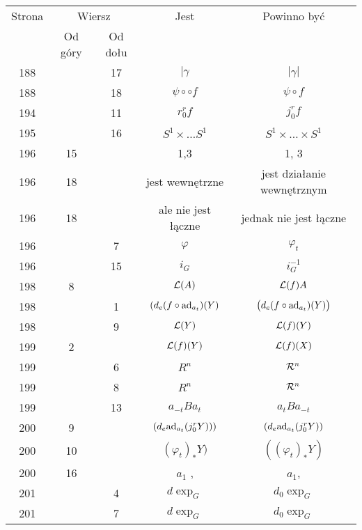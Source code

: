 \documentclass[a4paper,11pt]{article}
\begin{document}
\begin{center}
  \begin{tabular}{|c|c|c|c|c|}
    \hline
    Strona & \multicolumn{2}{c|}{Wiersz} & Jest
                              & Powinno być \\ \cline{2-3}
    & Od góry & Od dołu & & \\
    \hline
    188 & & 17 & $| \gamma$ & $| \gamma |$ \\
    188 & & 18 & $\psi \circ \circ f$ & $\psi \circ f$ \\
    194 & & 11 & $r^{ r }_{ 0 } f$ & $j^{ r }_{ 0 } f$ \\
    195 & & 16 & $S^{ 1 } \times \ldots S^{ 1 }$ & $S^{ 1 } \times \ldots \times S^{ 1 }$ \\
    196 & 15 & & 1,3 & 1, 3 \\
    196 & 18 & & jest wewnętrzne & jest działanie wewnętrznym \\
    196 & 18 & & ale nie jest łączne & jednak nie jest łączne \\
    196 & & \hphantom{0}7 & $\varphi$ & $\varphi_{ t }$ \\
    196 & & 15 & $i_{ G }$ & $i_{ G }^{ -1 }$ \\
    198 & \hphantom{0}8 & & $\mathcal{L}( A )$ & $\mathcal{L}( f )A$ \\
    198 & & \hphantom{0}1 & $( d_{ e }( f \circ \mathrm{ad}_{ a_{ t } } )( Y )$
           & $\big( d_{ e }( f \circ \mathrm{ad}_{ a_{ t } } )( Y ) \big)$ \\
    198 & & \hphantom{0}9 & $\mathcal{L}( Y )$ & $\mathcal{L}( f )( Y )$ \\
    199 & \hphantom{0}2 & & $\mathcal{L}( f )( Y )$ & $\mathcal{L}( f )( X )$ \\
    199 & & \hphantom{0}6 & $R^{ n }$ & $\mathcal{R}^{ n }$ \\
    199 & & \hphantom{0}8 & $R^{ n }$ & $\mathcal{R}^{ n }$ \\
    199 & & 13 & $a_{ -t } B a_{ t }$ & $a_{ t } B a_{ -t }$ \\
    200 & \hphantom{0}9 & & $( d_{ e }\mathrm{ad}_{ a_{ t } }( j^{ r }_{ 0 } Y ) ) )$
           & $( d_{ e }\mathrm{ad}_{ a_{ t } }( j^{ r }_{ 0 } Y ) )$ \\
    200 & 10 & & $( \varphi_{ t } )_{ * } Y )$
           & $( ( \varphi_{ t } )_{ * } Y )$ \\
    200 & 16 & & $a_{ 1 }$ , & $a_{ 1 }$, \\
    201 & & \hphantom{0}4 & $d \exp_{ G }$ & $d_{ 0 } \exp_{ G }$ \\
    201 & & \hphantom{0}7 & $d \exp_{ G }$ & $d_{ 0 } \exp_{ G }$ \\

\end{tabular}
\end{center}
\end{document}

